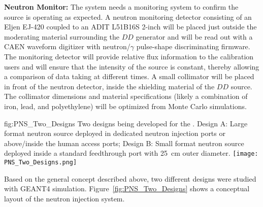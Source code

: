 {\bf Neutron Monitor:} The system needs a monitoring system to confirm the source is operating as expected.  A neutron monitoring detector consisting of an Eljen EJ-420 coupled to an ADIT L51B16S \num{2}-inch  will be placed just outside the moderating material surrounding the $DD$ generator and will be read out with a CAEN waveform digitizer with neutron/$\gamma$ pulse-shape discriminating firmware. The monitoring detector will provide relative flux information to the calibration users and will ensure that the intensity of the source is constant, thereby allowing a comparison of data taking at different times.  A small collimator will be placed in front of the neutron detector, inside the shielding material of the $DD$ source. The collimator dimensions and material specifications (likely a combination of iron, lead, and polyethylene) will be optimized from Monte Carlo simulations.

\begin{dunefigure}{fig:PNS_Two_Designs}
{Two designs being developed for the . Design A: Large format neutron source deployed in dedicated neutron injection ports or above/inside the human access ports; Design B: Small format neutron source deployed inside a standard feedthrough port with \SI{25}{\cm} outer diameter.}
\texttt{[image: PNS\_Two\_Designs.png]}
\end{dunefigure}

Based on the general concept described above, two different designs were studied with GEANT4 simulation. Figure~\ref{fig:PNS_Two_Designs} shows a conceptual layout of the neutron injection system. %

